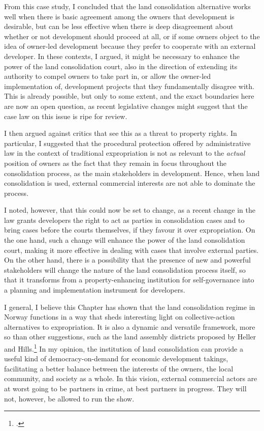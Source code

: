 From this case study, I concluded that the land consolidation alternative works well when there is basic agreement among the owners that development is desirable, but can be less effective when there is deep disagreement about whether or not development should proceed at all, or if some owners object to the idea of owner-led development because they prefer to cooperate with an external developer. In these contexts, I argued, it might be necessary to enhance the power of the land consolidation court, also in the direction of extending its authority to compel owners to take part in, or allow the owner-led implementation of, development projects that they fundamentally disagree with. This is already possible, but only to some extent, and the exact boundaries here are now an open question, as recent legislative changes might suggest that the case law on this issue is ripe for review.

I then argued against critics that see this as a threat to property rights. In particular, I suggested that the procedural protection offered by administrative law in the context of traditional expropriation is not as relevant to the {\it actual} position of owners as the fact that they remain in focus throughout the consolidation process, as the main stakeholders in development. Hence, when land consolidation is used, external commercial interests are not able to dominate the process. 

I noted, however, that this could now be set to change, as a recent change in the law grants developers the right to act as parties in consolidation cases and to bring cases before the courts themselves, if they favour it over expropriation. On the one hand, such a change will enhance the power of the land consolidation court, making it more effective in dealing with cases that involve external parties. On the other hand, there is a possibility that the presence of new and powerful stakeholders will change the nature of the land consolidation process itself, so that it transforms from a property-enhancing institution for self-governance into a planning and implementation instrument for developers.

I general, I believe this Chapter has shown that the land consolidation regime in Norway functions in a way that sheds interesting light on collective-action alternatives to expropriation. It is also a dynamic and versatile framework, more so than other suggestions, such as the land assembly districts proposed by Heller and Hills.\footcite{heller08} In my opinion, the institution of land consolidation can provide a useful kind of democracy-on-demand for economic development takings, facilitating a better balance between the interests of the owners, the local community, and society as a whole. In this vision, external commercial actors are at worst going to be partners in crime, at best partners in progress. They will not, however, be allowed to run the show.